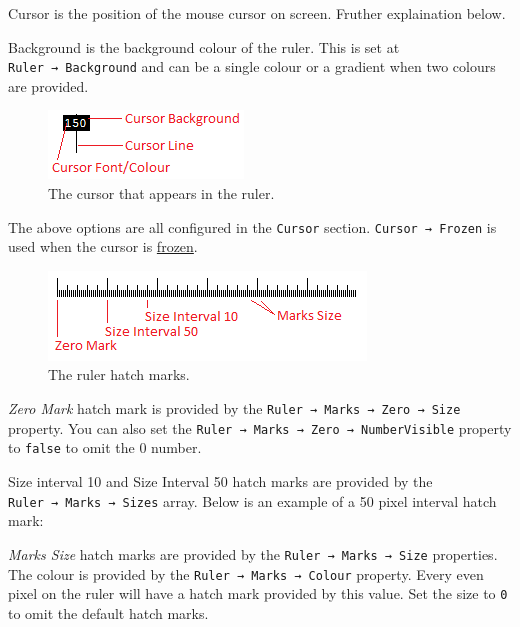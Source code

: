 \documentclass[
]{book}
\newenvironment{Shaded}{\begin{snugshade}}{\end{snugshade}}
\newcommand{\CommentTok}[1]{\textcolor[rgb]{0.56,0.35,0.01}{\textit{#1}}}
\begin{document}
Cursor is the position of the mouse cursor on screen.
Fruther explaination below.

Background is the background colour of the ruler.
This is set at \texttt{Ruler\ →\ Background} and can be a single colour or a gradient when two colours are provided.

\begin{figure}
\centering
\includegraphics{images/ruler-cursor.png}
\caption{\label{fig:unnamed-chunk-9}The cursor that appears in the ruler.}
\end{figure}

The above options are all configured in the \texttt{Cursor} section.
\texttt{Cursor\ →\ Frozen} is used when the cursor is \protect\hyperlink{freeze}{frozen}.

\begin{figure}
\centering
\includegraphics{images/ruler-hashmarks.png}
\caption{\label{fig:unnamed-chunk-10}The ruler hatch marks.}
\end{figure}

\emph{Zero Mark} hatch mark is provided by the \texttt{Ruler\ →\ Marks\ →\ Zero\ →\ Size} property.
You can also set the \texttt{Ruler\ →\ Marks\ →\ Zero\ →\ NumberVisible} property to \texttt{false} to omit the 0 number.

Size interval 10 and Size Interval 50 hatch marks are provided by the \texttt{Ruler\ →\ Marks\ →\ Sizes} array.
Below is an example of a 50 pixel interval hatch mark:

\begin{Shaded}
\end{Shaded}

\emph{Marks Size} hatch marks are provided by the \texttt{Ruler\ →\ Marks\ →\ Size} properties.
The colour is provided by the \texttt{Ruler\ →\ Marks\ →\ Colour} property.
Every even pixel on the ruler will have a hatch mark provided by this value.
Set the size to \texttt{0} to omit the default hatch marks.
\end{document}
